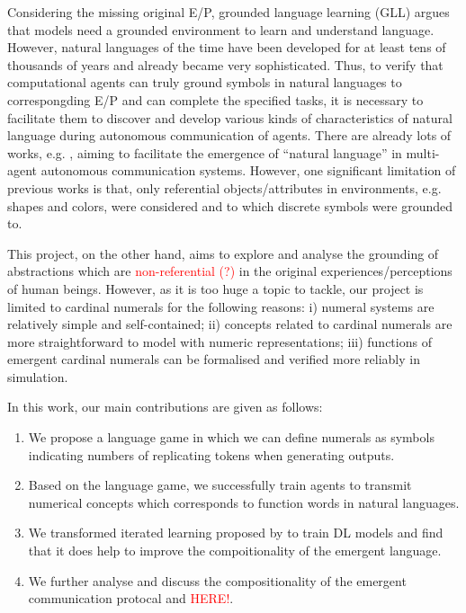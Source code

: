 \documentclass[msc,deptreport]{infthesis} %
\begin{document}
Considering the missing original E/P, grounded language learning (GLL) argues that models need a grounded environment to learn and understand language\cite{matuszek2018grounded}. However, natural languages of the time have been developed for at least tens of thousands of years\cite{berwick2016only} and already became very sophisticated. Thus, to verify that computational agents can truly ground symbols in natural languages to correspongding E/P and can complete the specified tasks, it is necessary to facilitate them to discover and develop various kinds of characteristics of natural language during autonomous communication of agents. There are already lots of works, e.g. \cite{hill2017understanding, havrylov2017emergence, yu2018interactive, kottur2017natural}, aiming to facilitate the emergence of ``natural language'' in multi-agent autonomous communication systems. However, one significant limitation of previous works is that, only referential objects/attributes in environments, e.g. shapes and colors, were considered and to which discrete symbols were grounded to.

This project, on the other hand, aims to explore and analyse the grounding of abstractions which are \textcolor{red}{non-referential (?)} in the original experiences/perceptions of human beings. However, as it is too huge a topic to tackle, our project is limited to cardinal numerals for the following reasons: i) numeral systems are relatively simple and self-contained\cite{james1999numeral}; ii) concepts related to cardinal numerals are more straightforward to model with numeric representations; iii) functions of emergent cardinal numerals can be formalised and verified more reliably in simulation.

In this work, our main contributions are given as follows:

\begin{enumerate}
  \item We propose a language game in which we can define numerals as symbols indicating numbers of replicating tokens when generating outputs.
  \item Based on the language game, we successfully train agents to transmit numerical concepts which corresponds to function words in natural languages.
  \item We transformed iterated learning proposed by \cite{smith2003iterated} to train DL models and find that it does help to improve the compoitionality of the emergent language.
  \item We further analyse and discuss the compositionality of the emergent communication protocal and \textcolor{red}{HERE!}.
\end{enumerate}
\end{document}
